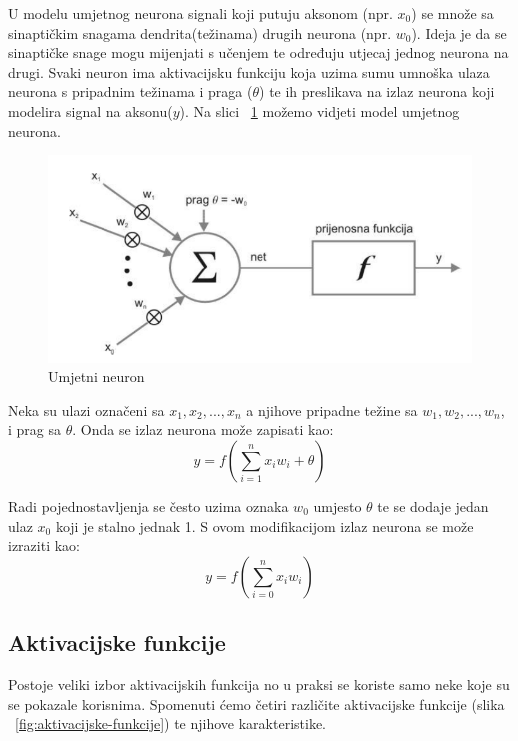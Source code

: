 \documentclass[times, utf8, zavrsni, numeric]{fer}
\begin{document}
U modelu umjetnog neurona signali koji putuju aksonom (npr. \textbf{$x_{0}$}) se množe sa sinaptičkim snagama dendrita(težinama) drugih neurona (npr. \textbf{$w_{0}$}). Ideja je da se sinaptičke snage mogu mijenjati s učenjem te određuju utjecaj jednog neurona na drugi. Svaki neuron ima aktivacijsku funkciju koja uzima sumu umnoška ulaza neurona s pripadnim težinama i praga ($\theta$) te ih preslikava na izlaz neurona koji modelira signal na aksonu($y$). Na slici ~\ref{fig:umj-neuron} možemo vidjeti model umjetnog neurona. 
\begin{figure}
    \centering
    \includegraphics[width=12cm]{img/umj-neuron.png}
    \caption{Umjetni neuron}
    \label{fig:umj-neuron}
\end{figure}

Neka su ulazi označeni sa $x_{1},x_{2},...,x_{n}$ a njihove pripadne težine sa $w_{1},w_{2},...,w_{n}$, i prag sa $\theta$. Onda se izlaz neurona može zapisati kao:
\begin{equation}
y = f(\displaystyle\sum_{i=1}^{n}x_iw_i + \theta)
\end{equation}

Radi pojednostavljenja se često uzima oznaka $w_0$ umjesto $\theta$ te se dodaje jedan ulaz $x_0$ koji je stalno jednak 1. S ovom modifikacijom izlaz neurona se može izraziti kao:
\begin{equation}
y = f(\displaystyle\sum_{i=0}^{n}x_iw_i)
\end{equation}
\subsection{Aktivacijske funkcije}\label{Aktivacijske funkcije}
Postoje veliki izbor aktivacijskih funkcija no u praksi se koriste samo neke koje su se pokazale korisnima. Spomenuti ćemo četiri različite aktivacijske funkcije (slika ~\ref{fig:aktivacijske-funkcije}) te njihove karakteristike.
\end{document}
